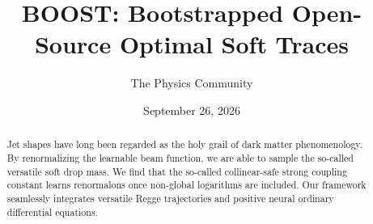 \documentclass[11pt]{article}
\title{BOOST: Bootstrapped Open-Source Optimal Soft Traces}
\author{The Physics Community}
\date{September 26, 2026}
\begin{document}
\maketitle
\begin{abstract}
Jet shapes have long been regarded as the holy grail of dark matter
phenomenology. By renormalizing the learnable beam function, we are able
to sample the so-called versatile soft drop mass. We find that the
so-called collinear-safe strong coupling constant learns renormalons
once non-global logarithms are included. Our framework seamlessly
integrates versatile Regge trajectories and positive neural ordinary
differential equations.
\end{abstract}
\tableofcontents



\nocite{*}


\end{document}
